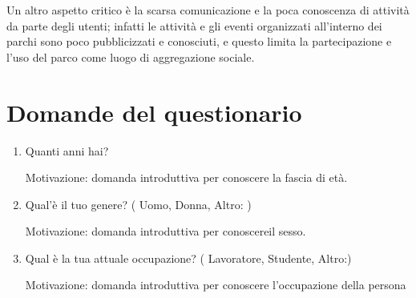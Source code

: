 Un altro aspetto critico è la scarsa comunicazione e la poca conoscenza di attività da parte degli utenti; infatti le attività e gli eventi organizzati all'interno dei parchi sono poco pubblicizzati e conosciuti, e questo limita la partecipazione e l'uso del parco come luogo di aggregazione sociale.

\section{Domande del questionario}
\begin{enumerate}
    \item Quanti anni hai?
	
    Motivazione: domanda introduttiva per conoscere la fascia di età.
    \item Qual'è il tuo genere? ( Uomo, Donna, Altro: )

    Motivazione: domanda introduttiva per conoscereil sesso.
    \item Qual è la tua attuale occupazione? ( Lavoratore, Studente, Altro:)
    
    Motivazione: domanda introduttiva per conoscere l'occupazione della persona
\end{enumerate}

